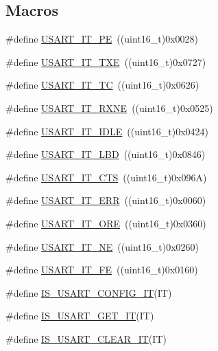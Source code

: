 \subsection*{Macros}
\begin{DoxyCompactItemize}
\item 
\#define \hyperlink{group___u_s_a_r_t___interrupt__definition_gae607c28a462c224c575b7541dc4f7067}{U\+S\+A\+R\+T\+\_\+\+I\+T\+\_\+\+PE}~((uint16\+\_\+t)0x0028)
\item 
\#define \hyperlink{group___u_s_a_r_t___interrupt__definition_gab18d0fe889204a4c34f6d5817fb5147d}{U\+S\+A\+R\+T\+\_\+\+I\+T\+\_\+\+T\+XE}~((uint16\+\_\+t)0x0727)
\item 
\#define \hyperlink{group___u_s_a_r_t___interrupt__definition_ga748e86162cc110513330079982821c39}{U\+S\+A\+R\+T\+\_\+\+I\+T\+\_\+\+TC}~((uint16\+\_\+t)0x0626)
\item 
\#define \hyperlink{group___u_s_a_r_t___interrupt__definition_gacdd49b93072655a21a63a35e6431f8ae}{U\+S\+A\+R\+T\+\_\+\+I\+T\+\_\+\+R\+X\+NE}~((uint16\+\_\+t)0x0525)
\item 
\#define \hyperlink{group___u_s_a_r_t___interrupt__definition_ga5d85aab24b7b2dfddb61ba2a49fa6185}{U\+S\+A\+R\+T\+\_\+\+I\+T\+\_\+\+I\+D\+LE}~((uint16\+\_\+t)0x0424)
\item 
\#define \hyperlink{group___u_s_a_r_t___interrupt__definition_ga063628e16cdda199b07d380421afc4a5}{U\+S\+A\+R\+T\+\_\+\+I\+T\+\_\+\+L\+BD}~((uint16\+\_\+t)0x0846)
\item 
\#define \hyperlink{group___u_s_a_r_t___interrupt__definition_gab49efbefaca2921e8cbe8f5146e99dbd}{U\+S\+A\+R\+T\+\_\+\+I\+T\+\_\+\+C\+TS}~((uint16\+\_\+t)0x096\+A)
\item 
\#define \hyperlink{group___u_s_a_r_t___interrupt__definition_ga631e83efd4c4789128d80a9539faf78a}{U\+S\+A\+R\+T\+\_\+\+I\+T\+\_\+\+E\+RR}~((uint16\+\_\+t)0x0060)
\item 
\#define \hyperlink{group___u_s_a_r_t___interrupt__definition_ga8b7d40e02a81be787fbb325bbe6dfbeb}{U\+S\+A\+R\+T\+\_\+\+I\+T\+\_\+\+O\+RE}~((uint16\+\_\+t)0x0360)
\item 
\#define \hyperlink{group___u_s_a_r_t___interrupt__definition_gad5de042f579b50f1e8643009176486b3}{U\+S\+A\+R\+T\+\_\+\+I\+T\+\_\+\+NE}~((uint16\+\_\+t)0x0260)
\item 
\#define \hyperlink{group___u_s_a_r_t___interrupt__definition_ga9af8790f78f6cb1591506c57d0cc0fb3}{U\+S\+A\+R\+T\+\_\+\+I\+T\+\_\+\+FE}~((uint16\+\_\+t)0x0160)
\item 
\#define \hyperlink{group___u_s_a_r_t___interrupt__definition_ga37ce140eae1938a414ff32afed5ef236}{I\+S\+\_\+\+U\+S\+A\+R\+T\+\_\+\+C\+O\+N\+F\+I\+G\+\_\+\+IT}(IT)
\item 
\#define \hyperlink{group___u_s_a_r_t___interrupt__definition_ga9a8014793a383d710eaaf4185f2b795d}{I\+S\+\_\+\+U\+S\+A\+R\+T\+\_\+\+G\+E\+T\+\_\+\+IT}(IT)
\item 
\#define \hyperlink{group___u_s_a_r_t___interrupt__definition_ga3ceda175140b84eea02a2261ebda4efd}{I\+S\+\_\+\+U\+S\+A\+R\+T\+\_\+\+C\+L\+E\+A\+R\+\_\+\+IT}(IT)
\end{DoxyCompactItemize}


